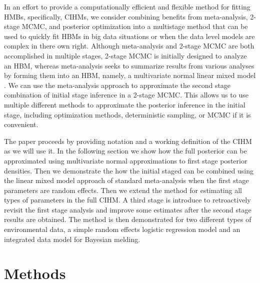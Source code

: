 \documentclass[12pt]{article}
\begin{document}
In an effort to provide a computationally efficient and flexible method for fitting HMBs, specifically, CIHMs, we consider combining benefits from meta-analysis, 2-stage MCMC, and posterior optimization into a multistage method that can be used to quickly fit HBMs in big data situations or when the data level models are complex in there own right. Although meta-analysis and 2-stage MCMC are both accomplished in multiple stages, 2-stage MCMC is initially designed to analyze an HBM, whereas meta-analysis seeks to summarize results from various analyses by forming them into an HBM, namely, a multivariate normal linear mixed model \citep{gasparrini2012multivariate}. We can use the meta-analysis approach to approximate the second stage combination of initial stage inference in a 2-stage MCMC. This allows us to use multiple different methods to approximate the posterior inference in the initial stage, including optimization methods, deterministic sampling, or MCMC if it is convenient. 

The paper proceeds by providing notation and a working definition of the CIHM as we will use it. In the following section we show how the full posterior can be approximated using multivariate normal approximations to first stage posterior densities. Then we demonstrate the how the initial staged can be combined using the linear mixed model approach of standard meta-analysis when the first stage parameters are random effects. Then we extend the method for estimating all types of parameters in the full CIHM. A third stage is introduce to retroactively revisit the first stage analysis and improve some estimates after the second stage results are obtained. The method is then demonstrated for two different types of environmental data, a simple random effects logistic regression model and an integrated data model for Bayesian melding. 


\section{Methods}
\end{document}
